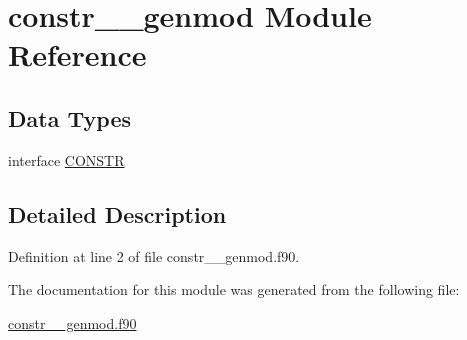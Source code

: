 \hypertarget{classconstr____genmod}{\section{constr\+\_\+\+\_\+genmod Module Reference}
\label{classconstr____genmod}
}
\subsection*{Data Types}
\begin{DoxyCompactItemize}
\item 
interface \hyperlink{interfaceconstr____genmod_1_1CONSTR}{C\+O\+N\+S\+T\+R}
\end{DoxyCompactItemize}


\subsection{Detailed Description}


Definition at line 2 of file constr\+\_\+\+\_\+genmod.\+f90.



The documentation for this module was generated from the following file\+:\begin{DoxyCompactItemize}
\item 
\hyperlink{constr____genmod_8f90}{constr\+\_\+\+\_\+genmod.\+f90}\end{DoxyCompactItemize}
